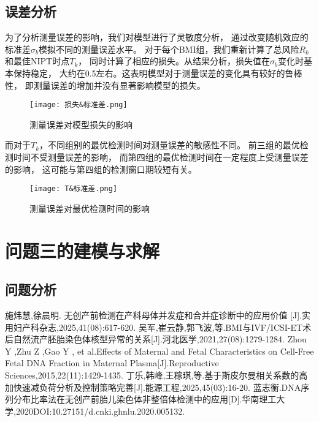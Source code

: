 \documentclass[withoutpreface,bwprint]{cumcmthesis} %
\begin{document}
\subsection{误差分析}
为了分析测量误差的影响，我们对模型进行了灵敏度分析，
通过改变随机效应的标准差$\sigma _b$模拟不同的测量误差水平。
对于每个BMI组，我们重新计算了总风险$R_k$和最佳NIPT时点$T_k$，
同时计算了相应的损失。从结果分析，损失值在$\sigma _b$变化时基本保持稳定，
大约在0.5左右。这表明模型对于测量误差的变化具有较好的鲁棒性，
即测量误差的增加并没有显著影响模型的损失。
\begin{figure}[!h]
    \centering
    \texttt{[image: 损失\&标准差.png]}
    \caption{测量误差对模型损失的影响}
    \label{fig5}
\end{figure}
\par 而对于$T_k$，不同组别的最优检测时间对测量误差的敏感性不同。
前三组的最优检测时间不受测量误差的影响，
而第四组的最优检测时间在一定程度上受测量误差的影响，
这可能与第四组的检测窗口期较短有关。
\begin{figure}[!h]
    \centering
    \texttt{[image: T\&标准差.png]}
    \caption{测量误差对最优检测时间的影响}
    \label{fig6}
\end{figure}


\section{问题三的建模与求解}
\subsection{问题分析}











\begin{thebibliography}{9}%
    施炜慧,徐晨明. 无创产前检测在产科母体并发症和合并症诊断中的应用价值 [J].实用妇产科杂志,2025,41(08):617-620.
    吴军,崔云静,郭飞波,等.BMI与IVF/ICSI-ET术后自然流产胚胎染色体核型异常的关系[J].河北医学,2021,27(08):1279-1284.
    Zhou Y ,Zhu Z ,Gao Y , et al.Effects of Maternal and Fetal Characteristics on Cell-Free Fetal DNA Fraction in Maternal Plasma[J].Reproductive Sciences,2015,22(11):1429-1435. 
    丁乐,韩峰,王稼琪,等.基于斯皮尔曼相关系数的高加快速减负荷分析及控制策略完善[J].能源工程,2025,45(03):16-20.
    蓝志衡.DNA序列分布比率法在无创产前胎儿染色体非整倍体检测中的应用[D].华南理工大学,2020\.DOI:10.27151/d.cnki.ghnlu.2020.005132.

\end{thebibliography}
\end{document}

